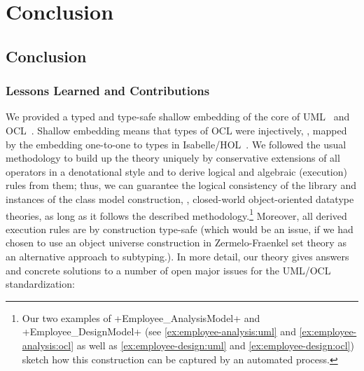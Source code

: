 \part{Conclusion}

\chapter{Conclusion}

\section{Lessons Learned and Contributions}
We provided a typed and type-safe shallow embedding of the core of
UML~\cite{omg:uml-infrastructure:2011,omg:uml-superstructure:2011} and
OCL~\cite{omg:ocl:2012}. Shallow embedding means that types of OCL
were injectively, \ie, mapped by the embedding one-to-one to types in
Isabelle/HOL~\cite{nipkow.ea:isabelle:2002}.  We followed the usual
methodology to build up the theory uniquely by conservative extensions
of all operators in a denotational style and to derive logical and
algebraic (execution) rules from them; thus, we can guarantee the
logical consistency of the library and instances of the class model
construction, \ie, closed-world object-oriented datatype theories, as
long as it follows the described methodology.\footnote{Our two
  examples of \inlineisar+Employee_AnalysisModel+ and
  \inlineisar+Employee_DesignModel+ (see
  \autoref{ex:employee-analysis:uml} and
  \autoref{ex:employee-analysis:ocl} as well as
  \autoref{ex:employee-design:uml} and
  \autoref{ex:employee-design:ocl}) sketch how this construction can
  be captured by an automated process.}  Moreover, all derived
execution rules are by construction type-safe (which would be an
issue, if we had chosen to use an object universe construction in
Zermelo-Fraenkel set theory as an alternative approach to subtyping.).
In more detail, our theory gives answers and concrete solutions to a
number of open major issues for the UML/OCL standardization:
